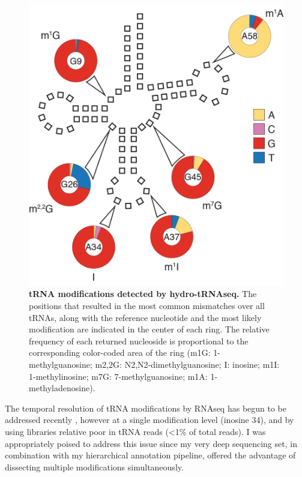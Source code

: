 \documentclass[12pt]{rockefeller}
\begin{document}
\begin{figure}[!ht]%
\centering
\includegraphics[scale=1]{paper7a.png}%
\caption[tRNA modifications detected by hydro-tRNAseq.]
{\textbf{tRNA modifications detected by hydro-tRNAseq.}
The positions that resulted in the most common mismatches over all tRNAs, along with the reference nucleotide and the most likely modification are indicated in the center of each ring. The relative frequency of each returned nucleoside is proportional to the corresponding color-coded area of the ring (m1G: 1-methylguanosine; m2,2G: N2,N2-dimethylguanosine; I: inosine; m1I: 1-methylinosine; m7G: 7-methylguanosine; m1A: 1-methyladenosine).}
\centering
\label{paper7a}%
\end{figure}

The temporal resolution of tRNA modifications by RNAseq has begun to be addressed recently  \cite{Torres:2015ed}, however at a single modification level (inosine 34), and by using libraries relative poor in tRNA reads (<1\% of total reads). I was appropriately poised to address this issue since my very deep sequencing set, in combination with my hierarchical annotation pipeline, offered the advantage of dissecting multiple modifications simultaneously. 
\end{document}
